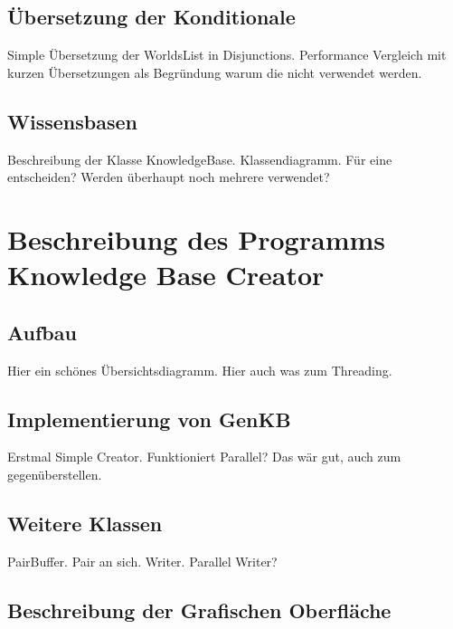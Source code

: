 \documentclass[12pt,a4paper]{article}
\begin{document}
\subsection{Übersetzung der Konditionale}
Simple Übersetzung der WorldsList in Disjunctions. Performance Vergleich mit kurzen Übersetzungen als Begründung warum die nicht verwendet werden.
\subsection{Wissensbasen}
Beschreibung der Klasse KnowledgeBase. Klassendiagramm. Für eine entscheiden? Werden überhaupt noch mehrere verwendet?
\section{Beschreibung des Programms Knowledge Base Creator}
\subsection{Aufbau}
Hier ein schönes Übersichtsdiagramm. Hier auch was zum Threading.
\subsection{Implementierung von GenKB}
Erstmal Simple Creator. Funktioniert Parallel? Das wär gut, auch zum gegenüberstellen.
\subsection{Weitere Klassen}
PairBuffer. Pair an sich. Writer. Parallel Writer?
\subsection{Beschreibung der Grafischen Oberfläche}



\newpage

 
\end{document}
